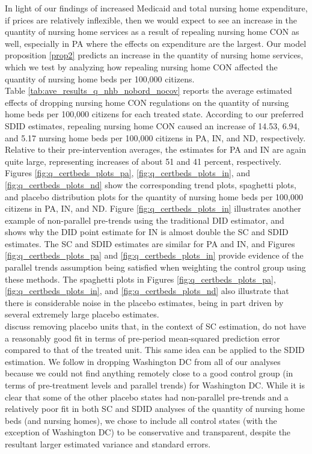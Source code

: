 \documentclass[../Main.tex]{subfiles}
\begin{document}
\indent In light of our findings of increased Medicaid and total nursing home expenditure, if prices are relatively inflexible, then we would expect to see an increase in the quantity of nursing home services as a result of repealing nursing home CON as well, especially in PA where the effects on expenditure are the largest. Our model proposition \ref{prop2} predicts an increase in the quantity of nursing home services, which we test by analyzing how repealing nursing home CON affected the quantity of nursing home beds per 100,000 citizens.\\
\indent Table \ref{tab:ave_results_q_nhb_nobord_nocov} reports the average estimated effects of dropping nursing home CON regulations on the quantity of nursing home beds per 100,000 citizens for each treated state. According to our preferred SDID estimates, repealing nursing home CON caused an increase of 14.53, 6.94, and 5.17 nursing home beds per 100,000 citizens in PA, IN, and ND, respectively. Relative to their pre-intervention averages, the estimates for PA and IN are again quite large, representing increases of about 51 and 41 percent, respectively. Figures \ref{fig:q_certbeds_plots_pa}, \ref{fig:q_certbeds_plots_in}, and \ref{fig:q_certbeds_plots_nd} show the corresponding trend plots, spaghetti plots, and placebo distribution plots for the quantity of nursing home beds per 100,000 citizens in PA, IN, and ND. Figure \ref{fig:q_certbeds_plots_in} illustrates another example of non-parallel pre-trends using the traditional DID estimator, and shows why the DID point estimate for IN is almost double the SC and SDID estimates. The SC and SDID estimates are similar for PA and IN, and Figures \ref{fig:q_certbeds_plots_pa} and \ref{fig:q_certbeds_plots_in} provide evidence of the parallel trends assumption being satisfied when weighting the control group using these methods. The spaghetti plots in Figures \ref{fig:q_certbeds_plots_pa}, \ref{fig:q_certbeds_plots_in}, and \ref{fig:q_certbeds_plots_nd} also illustrate that there is considerable noise in the placebo estimates, being in part driven by several extremely large placebo estimates.\\
\indent \citet{abadie2010synthetic} discuss removing placebo units that, in the context of SC estimation, do not have a reasonably good fit in terms of pre-period mean-squared prediction error compared to that of the treated unit. This same idea can be applied to the SDID estimation. We follow \citet{abadie2010synthetic} in dropping Washington DC from all of our analyses because we could not find anything remotely close to a good control group (in terms of pre-treatment levels and parallel trends) for Washington DC. While it is clear that some of the other placebo states had non-parallel pre-trends and a relatively poor fit in both SC and SDID analyses of the quantity of nursing home beds (and nursing homes), we chose to include all control states (with the exception of Washington DC) to be conservative and transparent, despite the resultant larger estimated variance and standard errors.\\
\end{document}
